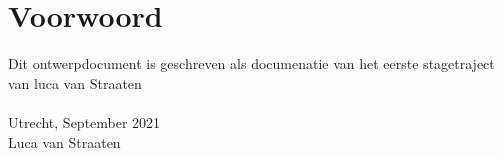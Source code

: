 \chapter*{Voorwoord}

Dit ontwerpdocument is geschreven als documenatie van het eerste stagetraject
van luca van Straaten\\\\

Utrecht, September 2021\\Luca van Straaten


